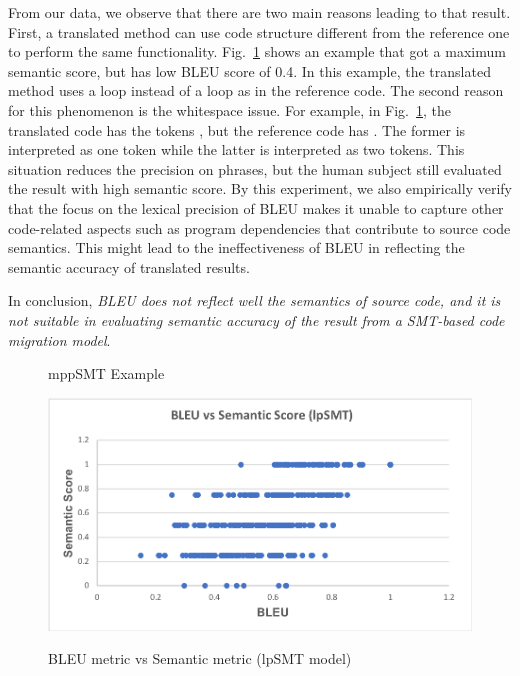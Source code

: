 From our data, we observe that there are two main reasons leading to
that result.
%
First, a translated method can use code structure different from the
reference one to perform the same
functionality. Fig.~\ref{fig:mppSMT_example} shows an example that got
a maximum semantic score, but has low BLEU score of 0.4. In this
example, the translated method uses a  loop instead of a
 loop as in the reference code. The second reason
for this phenomenon is the whitespace issue. For example, in
Fig.~\ref{fig:mppSMT_example}, the translated code has the tokens
, but the reference code has . The
former is interpreted as one token while the latter is interpreted as
two tokens.  This situation reduces the precision on phrases, but the
human subject still evaluated the result with high semantic score. By
this experiment, we also empirically verify that the focus on the
lexical precision of BLEU makes it unable to capture other
code-related aspects such as program dependencies that contribute to
source code semantics. This might lead to the ineffectiveness of BLEU
in reflecting the semantic accuracy of translated results.

In conclusion, {\em BLEU does not reflect well the
semantics of source code, and it is not suitable in evaluating
semantic accuracy of the result from a SMT-based code migration model}.

\begin{figure}[t]
\centering

\caption{mppSMT Example}
\label{fig:mppSMT_example}
\end{figure}




\begin{figure}
\caption{BLEU metric vs Semantic metric (lpSMT model)}
\centering
\includegraphics[scale=0.5]{img/bleuvssemantic_lpSMT.png}
\label{fig:BleuSemlpSMT}
\end{figure}

